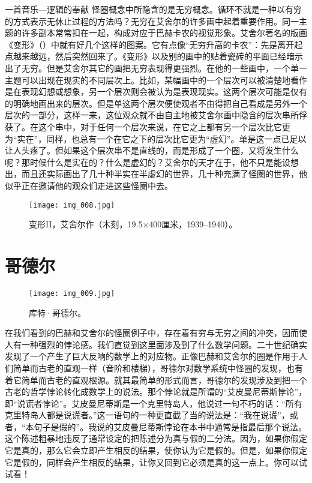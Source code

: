 \begin{intro}{一首音乐—逻辑的奉献}
怪圈概念中所隐含的是无穷概念。循环不就是一种以有穷的方式表示无休止过程的方法吗？无穷在艾舍尔的许多画中起着重要作用。同一主题的许多副本常常扣在一起，构成对应于巴赫卡农的视觉形象。艾舍尔著名的版画《变形》（）中就有好几个这样的图案。它有点像“无穷升高的卡农”：先是离开起点越来越远，然后突然回来了。《变形》以及别的画中的贴着瓷砖的平面已经暗示出了无穷。但是艾舍尔其它的画把无穷表现得更强烈。在他的一些画中，一个单一主题可以出现在现实的不同层次上。比如，某幅画中的一个层次可以被清楚地看作是在表现幻想或想象，另一个层次则会被认为是表现现实。这两个层次可能是仅有的明确地画出来的层次。但是单这两个层次便使观者不由得把自己看成是另外一个层次的一部分，这样一来，这位观众就不由自主地被艾舍尔画中隐含的层次串所俘获了。在这个串中，对于任何一个层次来说，在它之上都有另一个层次比它更为“实在”，同样，也总有一个在它之下的层次比它更为“虚幻”。单是这一点已足以让人头疼了。但如果这个层次串不是直线的，而是形成了一个圈，又将发生什么呢？那时候什么是实在的？什么是虚幻的？艾舍尔的天才在于，他不只是能设想出，而且还实际画出了几十种半实在半虚幻的世界，几十种充满了怪圈的世界，他似乎正在邀请他的观众们走进这些怪圈中去。

\begin{sidewaysfigure}
\texttt{[image: img\_008.jpg]}
\caption[变形II，艾舍尔作。]
  {变形II，艾舍尔作（木刻，19.5×400厘米，1939--1940）。}
\end{sidewaysfigure}

\section{哥德尔}

\begin{figure}
\texttt{[image: img\_009.jpg]}
\caption{库特·哥德尔。}
\end{figure}

在我们看到的巴赫和艾舍尔的怪圈例子中，存在着有穷与无穷之间的冲突，因而使人有一种强烈的悖论感。我们直觉到这里面涉及到了什么数学问题。二十世纪确实发现了一个产生了巨大反响的数学上的对应物。正像巴赫和艾舍尔的圈是作用于人们简单而古老的直观一样（音阶和楼梯），哥德尔对数学系统中怪圈的发现，也有着它简单而古老的直观根源。就其最简单的形式而言，哥德尔的发现涉及到把一个古老的哲学悖论转化成数学上的说法。那个悖论就是所谓的“艾皮曼尼蒂斯悖论”，即“说谎者悖论”。艾皮曼尼蒂斯是一个克里特岛人，他说过一句不朽的话：“所有克里特岛人都是说谎者。”这一语句的一种更直截了当的说法是：“我在说谎”，或者，“本句子是假的”。我说的艾皮曼尼蒂斯悖论在本书中通常是指最后那个说法。这个陈述粗暴地违反了通常设定的把陈述分为真与假的二分法。因为，如果你假定它是真的，那么它会立即产生相反的结果，使你认为它是假的。但是，如果你假定它是假的，同样会产生相反的结果，让你又回到它必须是真的这一点上。你可以试试看！


\end{intro}
